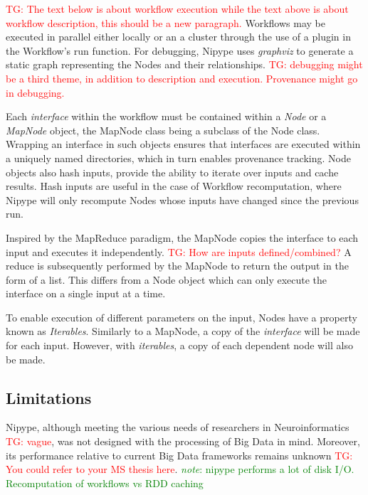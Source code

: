\documentclass{report}
\newcommand{\note}[1]{\textcolor{green}{\textit{note}: #1}}
\newcommand{\tristan}[1]{\textcolor{red}{TG: #1}}
\begin{document}
                \tristan{The text below is about workflow execution
                  while the text above is about workflow description,
                  this should be a new paragraph.}  Workflows may be
                executed in parallel either locally or an a cluster
                through the use of a plugin in the Workflow's run
                function. For debugging, Nipype uses \textit{graphviz}
                to generate a static graph representing the Nodes and
                their relationships. \tristan{debugging might be a
                  third theme, in addition to description and
                  execution. Provenance might go in debugging.}
		
		 Each \textit{interface} within the workflow must be
                 contained within a \textit{Node} or a
                 \textit{MapNode} object, the MapNode class being a
                 subclass of the Node class. Wrapping an interface in
                 such objects ensures that interfaces are executed
                 within a uniquely named directories, which in turn
                 enables provenance tracking. Node objects also hash
                 inputs, provide the ability to iterate over inputs
                 and cache results. Hash inputs are useful in the case
                 of Workflow recomputation, where Nipype will only
                 recompute Nodes whose inputs have changed since the
                 previous run.
		
		Inspired by the MapReduce paradigm, the MapNode copies
                the interface to each input and executes it
                independently. \tristan{How are inputs defined/combined?} A reduce is subsequently performed by
                the MapNode to return the output in the form of a
                list. This differs from a Node object which can only
                execute the interface on a single input at a time.
		
		To enable execution of different parameters on the
                input, Nodes have a property known as
                \textit{Iterables}. Similarly to a MapNode, a copy of
                the \textit{interface} will be made for each
                input. However, with \textit{iterables}, a copy of
                each dependent node will also be made.
		 
		\subsection{Limitations}
		Nipype, although meeting the various needs of
                researchers in Neuroinformatics \tristan{vague}, was
                not designed with the processing of Big Data in
                mind. Moreover, its performance relative to current
                Big Data frameworks remains unknown \tristan{You could
                  refer to your MS thesis here}.  \note{nipype
                  performs a lot of disk I/O. Recomputation of
                  workflows vs RDD caching}
		
\end{document}
